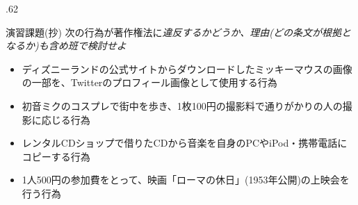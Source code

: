 \begin{columns}[onlytextwidth,t]
\begin{column}{.62\hsize}
\begin{exampleblock}{演習課題(抄)}
次の行為が著作権法に\em{違反するか}どうか、\em{理由(どの条文が根拠となるか)も含め}班で検討せよ
\begin{itemize}
	\item ディズニーランドの公式サイトからダウンロードしたミッキーマウスの画像の一部を、Twitterのプロフィール画像として使用する行為
	\item 初音ミクのコスプレで街中を歩き、1枚100円の撮影料で通りがかりの人の撮影に応じる行為
	\item レンタルCDショップで借りたCDから音楽を自身のPCやiPod・携帯電話にコピーする行為
	\item 1人500円の参加費をとって、映画「ローマの休日」(1953年公開)の上映会を行う行為
\end{itemize}
\end{exampleblock}
\end{column}
\end{columns}


